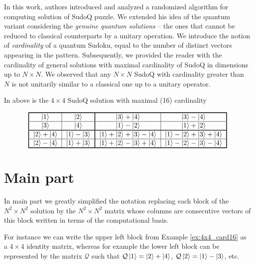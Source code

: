 \documentclass[11pt]{article}
\begin{document}
In this work, \cite{Nechita2020SudoQA} authors introduced and analyzed a randomized algorithm for computing solution of SudoQ puzzle. We extended his idea of the quantum variant considering the \emph{genuine quantum solutions} – the ones that cannot be reduced to classical counterparts by a unitary operation. 
We introduce the notion of \emph{cardinality} of a quantum Sudoku, equal to the number of distinct vectors appearing in the pattern. Subsequently, we provided the reader with the cardinality of general solutions with maximal cardinality of SudoQ in dimensions up to $N \times N$. We observed that any $N\times N$ SudoQ with cardinality greater than $N$ is not unitarily similar to a classical one up to a unitary operator. 

In above is the $4 \times 4$ SudoQ solution with maximal (16) cardinality
\begin{example}{}\label{ex:4x4_card16}
\[
 \begin{tabular}{!{\vrule width 1pt}c|c!{\vrule width 1pt}c|c!{\vrule width 1pt}}
    \noalign{\hrule height 1pt}
    $\ket{1}$ & $\ket{2}$ & $\ket{3}+\ket{4}$ & $\ket{3}-\ket{4}$ \tabularnewline
    \hline
    $\ket{3}$ & $\ket{4}$ & $\ket{1}-\ket{2}$ & $\ket{1}+\ket{2}$ \tabularnewline
    \noalign{\hrule height 1pt}
    $\ket{2}+\ket{4}$ & $\ket{1}-\ket{3}$ & $\ket{1}+\ket{2}+\ket{3}-\ket{4}$ & $\ket{1}-\ket{2}+\ket{3}+\ket{4}$ \tabularnewline
    \hline
    $\ket{2}-\ket{4}$ & $\ket{1}+\ket{3}$ & $\ket{1}+\ket{2}-\ket{3}+\ket{4}$ & $\ket{1}-\ket{2}-\ket{3}-\ket{4}$ \tabularnewline
    \noalign{\hrule height 1pt}
\end{tabular}
\]
\end{example}

\section{Main part}
In main part we greatly simplified the notation replacing each block of the $N^2\times N^2$ solution by the $N^2\times N^2$ matrix whose columns are consecutive vectors of this block written in terms of the computational basis. 

For instance we can write the upper left block from Example \ref{ex:4x4_card16} as a $4\times 4$ identity matrix, whereas for example the lower left block can be represented by the matrix $\mathcal{Q}$ such that $\mathcal{Q}\ket{1}=\ket{2}+\ket{4}$, $\mathcal{Q}\ket{2}=\ket{1}-\ket{3}$, etc.
\end{document}
